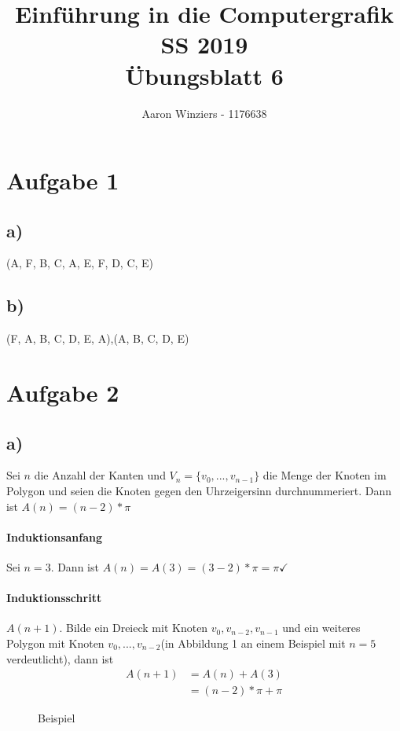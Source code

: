 \documentclass[11pt,a4paper,parskip=quarter ]{article}
\author{Aaron Winziers - 1176638}
\title{Einführung in die Computergrafik SS 2019\\\Large{Übungsblatt 6}}
\begin{document}
	\maketitle
	\section*{Aufgabe 1}
	\subsection*{a)}(A, F, B, C, A, E, F, D, C, E)
	\subsection*{b)}(F, A, B, C, D, E, A),(A, B, C, D, E)
	
	\section*{Aufgabe 2}
	\subsection*{a)}
	
	Sei $n$ die Anzahl der Kanten und $V_{n} = \{v_{0}, ... , v_{n-1}\}$ die Menge der Knoten im Polygon und seien die Knoten gegen den Uhrzeigersinn durchnummeriert. Dann ist $A(n)=(n-2)\ast\pi$ 
	
	\paragraph*{Induktionsanfang}
	
	Sei $n=3$. Dann ist $A(n)=A(3)=(3-2)\ast\pi=\pi\checkmark$
	
	\paragraph{Induktionsschritt}
	
	$A(n+1)$. Bilde ein Dreieck mit Knoten $v_{0},v_{n-2},v_{n-1}$ und ein weiteres Polygon mit Knoten $v_{0},...,v_{n-2}$(in Abbildung 1 an einem Beispiel mit $n=5$ verdeutlicht), dann ist
	\begin{align*}
		A(n+1)	&=A(n)+A(3)	\\
				&=(n-2)\ast\pi+\pi
	\end{align*}
	
	\begin{center}
		\begin{figure}
			\centering
			\caption{Beispiel}
		\end{figure}
	\end{center}
\end{document}

